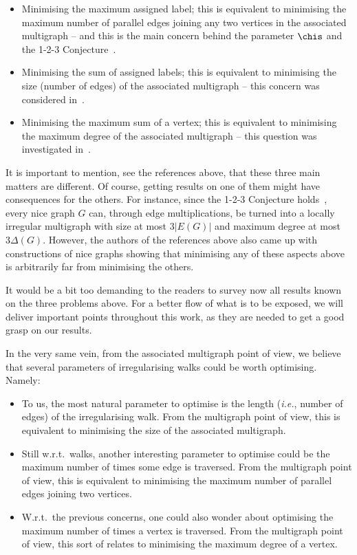 \documentclass[a4paper,11pt,dvipsnames]{elsarticle}
\begin{document}
\begin{itemize}
	\item Minimising the maximum assigned label; 
	this is equivalent to minimising the maximum number of parallel edges joining any two vertices in the associated multigraph --
	and this is the main concern behind the parameter $\chis$ and the 1-2-3 Conjecture~\cite{KLT04}.
	
	\item Minimising the sum of assigned labels;
	this is equivalent to minimising the size (number of edges) of the associated multigraph --
	this concern was considered in~\cite{BFN22}.
	
	\item Minimising the maximum sum of a vertex;
	this is equivalent to minimising the maximum degree of the associated multigraph --
	this question was investigated in~\cite{BLLN21}.
\end{itemize}

\noindent It is important to mention, see the references above,
that these three main matters are different. Of course, getting results on one of them might have consequences for the others.
For instance, since the 1-2-3 Conjecture holds~\cite{Keu24}, every nice graph $G$ can, through edge multiplications,
be turned into a locally irregular multigraph with size at most $3|E(G)|$ and maximum degree at most $3\Delta(G)$.
However, the authors of the references above also came up with constructions of nice graphs showing that minimising any of these aspects above
is arbitrarily far from minimising the others.

It would be a bit too demanding to the readers to survey now all results known on the three problems above.
For a better flow of what is to be exposed,
we will deliver important points throughout this work, as they are needed to get a good grasp on our results.

\medskip

In the very same vein, from the associated multigraph point of view, 
we believe that several parameters of irregularising walks could be worth optimising.
Namely:

\begin{itemize}
	\item To us, the most natural parameter to optimise is the length (\textit{i.e.}, number of edges)
	of the irregularising walk. From the multigraph point of view,
	this is equivalent to minimising the size of the associated multigraph.
	
	\item Still w.r.t.~walks, another interesting parameter to optimise could be the maximum number of times some edge is traversed.
	From the multigraph point of view, this is equivalent to minimising the maximum number of parallel edges joining two vertices.
	
	\item W.r.t.~the previous concerns, one could also wonder about optimising the maximum number of times a vertex is traversed.
	From the multigraph point of view, this sort of relates to minimising the maximum degree of a vertex.
\end{itemize} 
\end{document}
